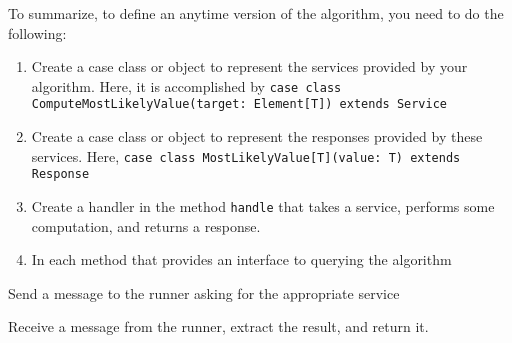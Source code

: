 
To summarize, to define an anytime version of the algorithm, you need to do the following:

\begin{enumerate}
\item Create a case class or object to represent the services provided by your algorithm. Here, it is accomplished by
\newline \texttt{case class ComputeMostLikelyValue(target: Element[T]) 
\newline extends Service}
\item Create a case class or object to represent the responses provided by these
services. Here,
\newline \texttt{case class MostLikelyValue[T](value: T)
\newline extends Response} 
\item Create a handler in the method \texttt{handle} that takes a service, performs some computation, and returns a response.
\item In each method that provides an interface to querying the algorithm
\end{enumerate}
\begin{aenumerate}
\item Send a message to the runner asking for the appropriate service
\item Receive a message from the runner, extract the result, and return it.
\end{aenumerate}
